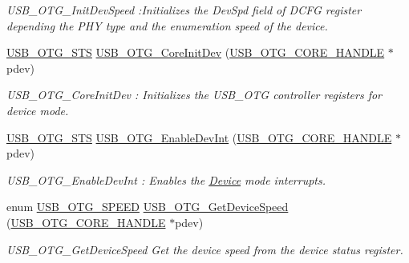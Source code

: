 \begin{DoxyCompactItemize}
\begin{DoxyCompactList}\small\item\em U\-S\-B\-\_\-\-O\-T\-G\-\_\-\-Init\-Dev\-Speed \-:Initializes the Dev\-Spd field of D\-C\-F\-G register depending the P\-H\-Y type and the enumeration speed of the device. \end{DoxyCompactList}\item 
\hyperlink{group___u_s_b___c_o_r_e___exported___types_ga8b6504b9af0662f17515795db0f9c8ed}{U\-S\-B\-\_\-\-O\-T\-G\-\_\-\-S\-T\-S} \hyperlink{group___u_s_b___c_o_r_e___private___functions_ga9e85559345e6e1eadde17fdbef28ebe2}{U\-S\-B\-\_\-\-O\-T\-G\-\_\-\-Core\-Init\-Dev} (\hyperlink{group___u_s_b___c_o_r_e___exported___types_gaf76054c11eb8a3367907aad7ae700e80}{U\-S\-B\-\_\-\-O\-T\-G\-\_\-\-C\-O\-R\-E\-\_\-\-H\-A\-N\-D\-L\-E} $\ast$pdev)
\begin{DoxyCompactList}\small\item\em U\-S\-B\-\_\-\-O\-T\-G\-\_\-\-Core\-Init\-Dev \-: Initializes the U\-S\-B\-\_\-\-O\-T\-G controller registers for device mode. \end{DoxyCompactList}\item 
\hyperlink{group___u_s_b___c_o_r_e___exported___types_ga8b6504b9af0662f17515795db0f9c8ed}{U\-S\-B\-\_\-\-O\-T\-G\-\_\-\-S\-T\-S} \hyperlink{group___u_s_b___c_o_r_e___private___functions_ga2959c9873c31cfc79f90ec16314360f0}{U\-S\-B\-\_\-\-O\-T\-G\-\_\-\-Enable\-Dev\-Int} (\hyperlink{group___u_s_b___c_o_r_e___exported___types_gaf76054c11eb8a3367907aad7ae700e80}{U\-S\-B\-\_\-\-O\-T\-G\-\_\-\-C\-O\-R\-E\-\_\-\-H\-A\-N\-D\-L\-E} $\ast$pdev)
\begin{DoxyCompactList}\small\item\em U\-S\-B\-\_\-\-O\-T\-G\-\_\-\-Enable\-Dev\-Int \-: Enables the \hyperlink{struct_device}{Device} mode interrupts. \end{DoxyCompactList}\item 
enum \hyperlink{group___internal___macro_ga5cb546411f61c7a89e7e9e2b7baf9296}{U\-S\-B\-\_\-\-O\-T\-G\-\_\-\-S\-P\-E\-E\-D} \hyperlink{group___u_s_b___c_o_r_e___private___functions_ga3e4675bb60bcdeba67e1ad120c8186f1}{U\-S\-B\-\_\-\-O\-T\-G\-\_\-\-Get\-Device\-Speed} (\hyperlink{group___u_s_b___c_o_r_e___exported___types_gaf76054c11eb8a3367907aad7ae700e80}{U\-S\-B\-\_\-\-O\-T\-G\-\_\-\-C\-O\-R\-E\-\_\-\-H\-A\-N\-D\-L\-E} $\ast$pdev)
\begin{DoxyCompactList}\small\item\em U\-S\-B\-\_\-\-O\-T\-G\-\_\-\-Get\-Device\-Speed Get the device speed from the device status register. \end{DoxyCompactList}\item 

\end{DoxyCompactItemize}
